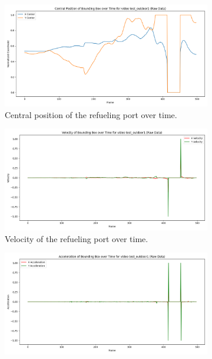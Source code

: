 \documentclass[12pt,oneside]{book} %
\begin{document}
\begin{figure}[H]
    \centering
    \begin{subfigure}[t]{0.6\textwidth}
        \includegraphics[width=\textwidth]{figures/bbox_metrics/test_outdoor1 (Raw Data)_central_position.png}
        \caption{Central position of the refueling port over time.}
        \label{fig:central-position-test-outdoor1}
    \end{subfigure}
    \hfill
    \begin{subfigure}[t]{0.6\textwidth}
        \includegraphics[width=\textwidth]{figures/bbox_metrics/test_outdoor1 (Raw Data)_velocity.png}
        \caption{Velocity of the refueling port over time.}
        \label{fig:velocity-test-outdoor1}
    \end{subfigure}
    \vfill
    \begin{subfigure}[t]{0.6\textwidth}
        \includegraphics[width=\textwidth]{figures/bbox_metrics/test_outdoor1 (Raw Data)_acceleration.png}

\end{subfigure}
\end{figure}
\end{document}
